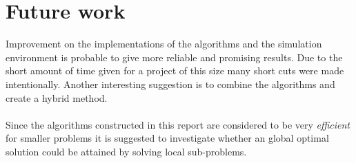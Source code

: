 
\section{Future work}
Improvement on the implementations of the algorithms and the simulation environment is probable to give more reliable and promising results. Due to the short amount of time given for a project of this size many short cuts were made intentionally. Another interesting suggestion is to combine the algorithms and create a hybrid method. \\
\\Since the algorithms constructed in this report are considered to be very \emph{efficient} for smaller problems it is suggested to investigate whether an global optimal solution could be attained by solving local sub-problems.
